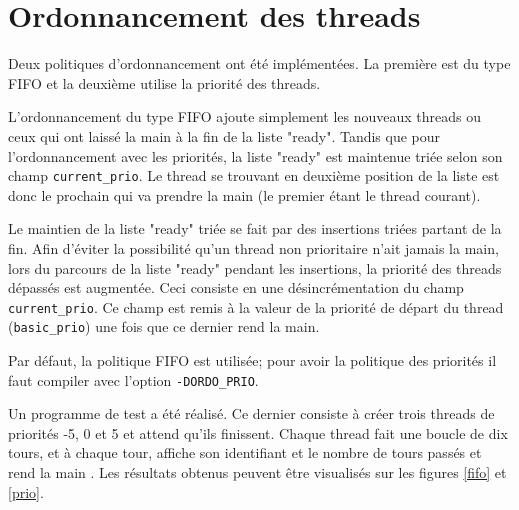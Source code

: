 \section{Ordonnancement des threads}
Deux politiques d'ordonnancement ont été implémentées. La première est
du type FIFO et la deuxième utilise la priorité des threads.

L'ordonnancement du type FIFO ajoute simplement les nouveaux threads
ou ceux qui ont laissé la main à la fin de la liste "ready". Tandis
que pour l'ordonnancement avec les priorités, la liste "ready" est
maintenue triée selon son champ \verb'current_prio'. Le thread se
trouvant en deuxième position de la liste est donc le prochain qui va
prendre la main (le premier étant le thread courant).

Le maintien de la liste "ready" triée se fait par des insertions
triées partant de la fin. Afin d'éviter la possibilité qu'un thread non
prioritaire n'ait jamais la main, lors du parcours de la liste "ready"
pendant les insertions, la priorité des threads dépassés est
augmentée. Ceci consiste en une désincrémentation du champ
\verb'current_prio'. Ce champ est remis à la valeur de la priorité de
départ du thread (\verb'basic_prio') une fois que ce dernier rend la
main.
 
Par défaut, la politique FIFO est utilisée; pour avoir la politique
des priorités il faut compiler avec l'option \verb'-DORDO_PRIO'.

Un programme de test a été réalisé. Ce dernier consiste à créer trois
threads de priorités -5, 0 et 5 et attend qu'ils finissent. Chaque
thread fait une boucle de dix tours, et à chaque tour, affiche son
identifiant et le nombre de tours passés et rend la main . Les résultats
obtenus peuvent être visualisés sur les figures \ref{fifo} et \ref{prio}.

